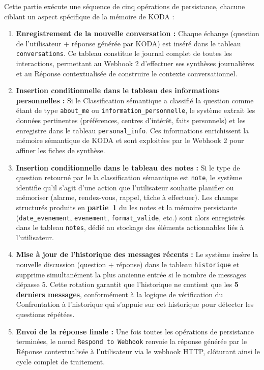 \documentclass[a4paper,12pt]{report}
\begin{document}
	\vspace{0.5em}
	
	Cette partie exécute une séquence de cinq opérations de persistance, chacune ciblant un aspect spécifique de la mémoire de KODA :
	
	\begin{enumerate}
		\item \textbf{Enregistrement de la nouvelle conversation :}
		Chaque échange (question de l'utilisateur + réponse générée par KODA) est inséré dans le tableau \texttt{conversations}. Ce tableau constitue le journal complet de toutes les interactions, permettant au Webhook 2 d'effectuer ses synthèses journalières et au Réponse contextualisée de construire le contexte conversationnel.
		
		\item \textbf{Insertion conditionnelle dans le tableau des informations personnelles :}
		Si le Classification sémantique a classifié la question comme étant de type \texttt{about\_me} ou \texttt{information\_personnelle}, le système extrait les données pertinentes (préférences, centres d'intérêt, faits personnels) et les enregistre dans le tableau \texttt{personal\_info}. Ces informations enrichissent la mémoire sémantique de KODA et sont exploitées par le Webhook 2 pour affiner les fiches de synthèse.
		
		\item \textbf{Insertion conditionnelle dans le tableau des notes :}
		Si le type de question retourné par le la classification sémantique est \texttt{note}, le système identifie qu'il s'agit d'une action que l'utilisateur souhaite planifier ou mémoriser (alarme, rendez-vous, rappel, tâche à effectuer). Les champs structurés produits en \textbf{partie~1} du les notes et la mémoire persistante (\texttt{date\_evenement}, \texttt{evenement}, \texttt{format\_valide}, etc.) sont alors enregistrés dans le tableau \texttt{notes}, dédié au stockage des éléments actionnables liés à l'utilisateur.
		
		\item \textbf{Mise à jour de l'historique des messages récents :}
		Le système insère la nouvelle discussion (question + réponse) dans le tableau \texttt{historique} et supprime simultanément la plus ancienne entrée si le nombre de messages dépasse 5. Cette rotation garantit que l'historique ne contient que les \textbf{5 derniers messages}, conformément à la logique de vérification du Confrontation à l'historique qui s'appuie sur cet historique pour détecter les questions répétées.
		
		\item \textbf{Envoi de la réponse finale :}
		Une fois toutes les opérations de persistance terminées, le nœud \texttt{Respond to Webhook} renvoie la réponse générée par le Réponse contextualisée à l'utilisateur via le webhook HTTP, clôturant ainsi le cycle complet de traitement.
	\end{enumerate}
	
\end{document}
